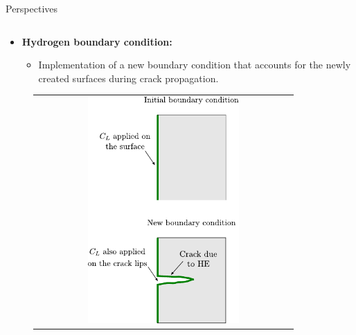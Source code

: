 \documentclass[9pt]{beamer}
\begin{document}
\begin{frame}{Perspectives}
\begin{columns}

        \begin{column}{0.5\textwidth}
        
        \begin{itemize}
        	\item \textbf{Hydrogen boundary condition:}
        	\vspace{0.15cm}
        	\begin{itemize}
        		\item Implementation of a new boundary condition that accounts for the newly created surfaces during crack propagation.
        	\end{itemize}
        \end{itemize}
        \vspace{0.2cm}
        	\begin{figure}
        		\begin{tabular}{c}
            		\includegraphics[width=0.6\textwidth]{Images/new_BC_CL.pdf} \\
        		\end{tabular}
    		\end{figure}
        \end{column}

    \end{columns}
    
\end{frame}
\end{document}
